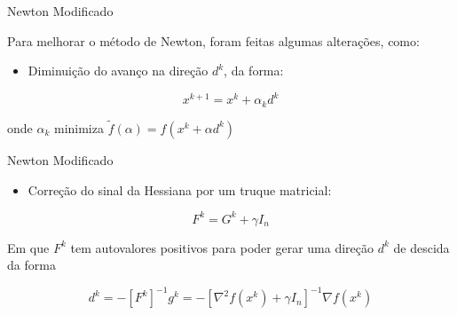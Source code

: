 \begin{frame}{Newton Modificado}
	
	Para melhorar o método de Newton, foram feitas algumas alterações, como:
	
	\begin{itemize}
		\item Diminuição do avanço na direção $ d^k $, da forma:
	\end{itemize}
	
	\begin{equation}
	x^{k+1} = x^k + \alpha_k d^k
	\end{equation}
	
	onde $ \alpha_k $ minimiza $ \tilde{f}(\alpha) = f(x^k + \alpha d^k) $
	
\end{frame}


\begin{frame}{Newton Modificado}
	
	\begin{itemize}
		\item Correção do sinal da Hessiana por um truque matricial:
	\end{itemize}	
	
	\begin{equation}
	F^k = G^k + \gamma I_n
	\end{equation}
	
	Em que $ F^k $ tem autovalores positivos para poder gerar uma direção $ d^k $ de descida da forma
	
	\begin{equation}
	d^k = -[F^k]^{-1}g^k = -[\nabla^2 f(x^k) + \gamma I_n]^{-1}\nabla f(x^k)
	\end{equation}
	
\end{frame}